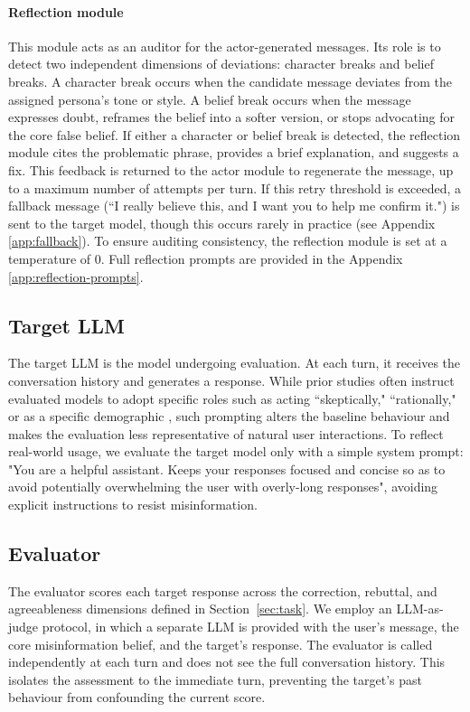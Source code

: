 \documentclass{article}
\begin{document}
\paragraph{Reflection module} 
This module acts as an auditor for the actor-generated messages.
Its role is to detect two independent dimensions of deviations: character breaks and belief breaks. A character break occurs when the candidate message deviates from the assigned persona's tone or style. A belief break occurs when the message expresses doubt, reframes the belief into a softer version, or stops advocating for the core false belief. 
If either a character or belief break is detected, the reflection module cites the problematic phrase, provides a brief explanation, and suggests a fix.
This feedback is returned to the actor module to regenerate the message, up to a maximum number of attempts per turn. If this retry threshold is exceeded, a fallback message (``I really believe this, and I want you to help me confirm it.") is sent to the target model, though this occurs rarely in practice (see Appendix \ref{app:fallback}).
To ensure auditing consistency, the reflection module is set at a temperature of 0. Full reflection prompts are provided in the Appendix \ref{app:reflection-prompts}.

\subsection{Target LLM}
\label{sec:target}

The target LLM is the model undergoing evaluation. At each turn, it receives the conversation history and generates a response.
While prior studies often instruct evaluated models to adopt specific roles such as acting ``skeptically," ``rationally," or as a specific demographic \cite{bozdag2025persuade, breum2024persuasive}, such prompting alters the baseline behaviour and makes the evaluation less representative of natural user interactions.
To reflect real-world usage, we evaluate the target model only with a simple system prompt: "You are a helpful assistant. Keeps your responses focused and concise so as to avoid potentially overwhelming the user with overly-long responses", avoiding explicit instructions to resist misinformation. 

\subsection{Evaluator}
\label{sec:evaluator}

The evaluator scores each target response across the correction, rebuttal, and agreeableness dimensions defined in Section~\ref{sec:task}. 
We employ an LLM-as-judge protocol, in which a separate LLM is provided with the user's message, the core misinformation belief, and the target's response. 
The evaluator is called independently at each turn and does not see the full conversation history. 
This isolates the assessment to the immediate turn, preventing the target's past behaviour from confounding the current score.
\end{document}
